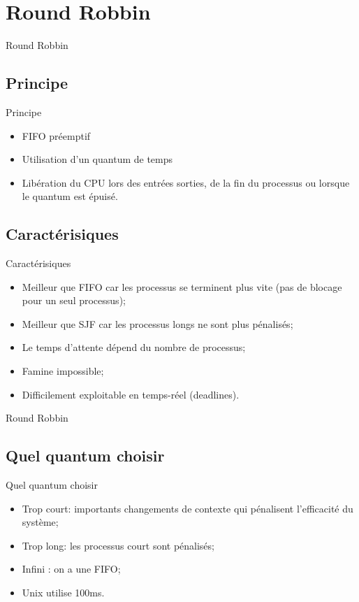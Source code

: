\def\sectitle{Round Robbin}
\section{\sectitle}

\begin{frame}{\sectitle}
\def\subsectitle{Principe}
\subsection{\subsectitle}

\begin{exampleblock}{\subsectitle}
\begin{itemize}
    \item FIFO préemptif
    \item Utilisation d'un quantum de temps
    \item Libération du CPU lors des entrées sorties, de la fin du processus ou
    lorsque le quantum est épuisé.
\end{itemize}
\end{exampleblock}


\def\subsectitle{Caractérisiques}
\subsection{\subsectitle}
\begin{block}{\subsectitle}
\begin{itemize}
    \item Meilleur que FIFO car les processus se terminent plus vite (pas de
    blocage pour un seul processus);
    \item Meilleur que SJF car les processus longs ne sont plus pénalisés;
    \item Le temps d'attente dépend du nombre de processus;
    \item Famine impossible;
    \item Difficilement exploitable en temps-réel (deadlines).
\end{itemize}
\end{block}

\end{frame}

\begin{frame}{\sectitle}
\def\subsectitle{Quel quantum choisir}
\subsection{\subsectitle}

\begin{alertblock}{\subsectitle}
\begin{itemize}
    \item Trop court: importants changements de contexte qui pénalisent
        l'efficacité du système;
    \item Trop long: les processus court sont pénalisés;
    \item Infini : on a une FIFO;
    \item Unix utilise 100ms.
\end{itemize}
\end{alertblock}

\end{frame}


